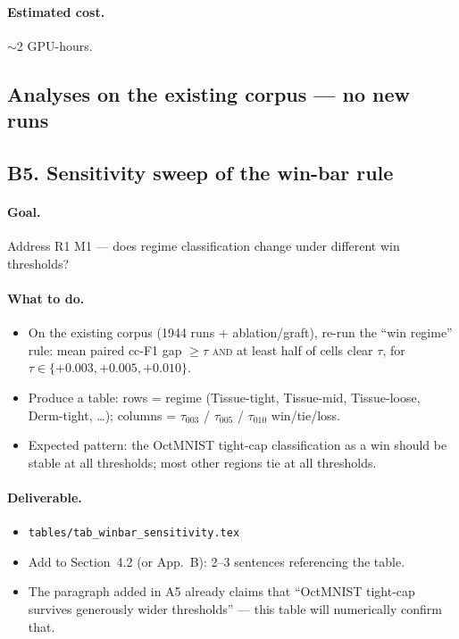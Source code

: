 \documentclass[11pt,a4paper]{article}
\newcommand{\file}[1]{\texttt{#1}}
\begin{document}
\paragraph{Estimated cost.} $\sim$2 GPU-hours.

\subsection*{Analyses on the existing corpus --- no new runs}

\subsection{B5. Sensitivity sweep of the win-bar rule}

\paragraph{Goal.} Address R1 M1 --- does regime classification change under
different win thresholds?

\paragraph{What to do.}
\begin{itemize}[nosep]
  \item On the existing corpus (1944 runs + ablation/graft), re-run the
        ``win regime'' rule: mean paired cc-F1 gap $\ge \tau$
        \textsc{and} at least half of cells clear $\tau$, for
        $\tau \in \{+0.003, +0.005, +0.010\}$.
  \item Produce a table: rows = regime (Tissue-tight, Tissue-mid,
        Tissue-loose, Derm-tight, \dots); columns = $\tau_{003}$ /
        $\tau_{005}$ / $\tau_{010}$ win/tie/loss.
  \item Expected pattern: the OctMNIST tight-cap classification as a win
        should be stable at all thresholds; most other regions tie at all
        thresholds.
\end{itemize}

\paragraph{Deliverable.}
\begin{itemize}[nosep]
  \item \file{tables/tab\_winbar\_sensitivity.tex}
  \item Add to Section~4.2 (or App.~B): 2--3 sentences referencing the
        table.
  \item The paragraph added in A5 already claims that ``OctMNIST tight-cap
        survives generously wider thresholds'' --- this table will
        numerically confirm that.
\end{itemize}
\end{document}
